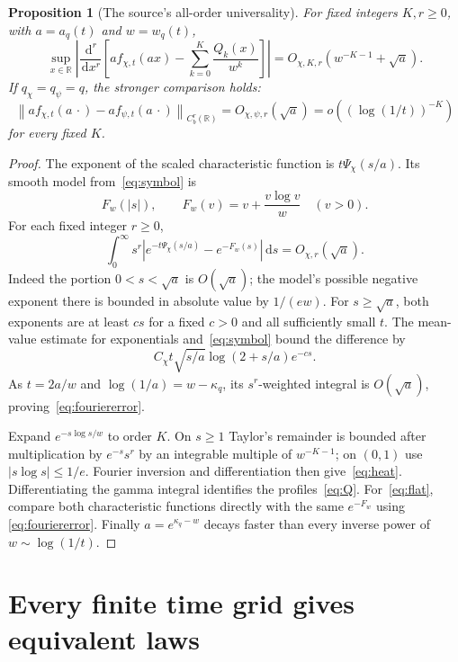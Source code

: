 \documentclass[11pt]{article}
\newtheorem{proposition}[theorem]{Proposition}
\theoremstyle{definition}
\newcommand{\R}{\mathbb R}
\newcommand{\dd}{\,\mathrm d}
\newcommand{\abs}[1]{\left|#1\right|}
\newcommand{\norm}[1]{\left\lVert#1\right\rVert}
\begin{document}
\begin{proposition}[The source's all-order universality]\label{prop:heat}
For fixed integers $K,r\ge0$, with $a=a_q(t)$ and $w=w_q(t)$,
\begin{equation}\label{eq:heat}
 \sup_{x\in\R}\left|\frac{\dd^r}{\dd x^r}
   \left[a f_{\chi,t}(ax)-\sum_{k=0}^K\frac{Q_k(x)}{w^k}\right]\right|
      =O_{\chi,K,r}(w^{-K-1}+\sqrt a).
\end{equation}
If $q_\chi=q_\psi=q$, the stronger comparison holds:
\begin{equation}\label{eq:flat}
 \norm{a f_{\chi,t}(a\,\cdot)-a f_{\psi,t}(a\,\cdot)}_{C_b^r(\R)}
       =O_{\chi,\psi,r}(\sqrt a)
       =o((\log(1/t))^{-K})
\end{equation}
for every fixed $K$.
\end{proposition}

\begin{proof}
The exponent of the scaled characteristic function is $t\Psi_\chi(s/a)$.
Its smooth model from~\eqref{eq:symbol} is
\[
 F_w(\abs s),\qquad F_w(v)=v+\frac{v\log v}{w}\quad(v>0).
\]
For each fixed integer $r\ge0$,
\begin{equation}\label{eq:fouriererror}
 \int_0^\infty s^r
      \abs{e^{-t\Psi_\chi(s/a)}-e^{-F_w(s)}}\dd s
          =O_{\chi,r}(\sqrt a).
\end{equation}
Indeed the portion $0<s<\sqrt a$ is $O(\sqrt a)$; the model's possible negative
exponent there is bounded in absolute value by $1/(ew)$. For $s\ge\sqrt a$,
both exponents are at least $cs$ for a fixed $c>0$ and all sufficiently small
$t$. The mean-value estimate for exponentials and~\eqref{eq:symbol} bound
the difference by
\[
 C_\chi t\sqrt{s/a}\log(2+s/a)e^{-cs}.
\]
As $t=2a/w$ and $\log(1/a)=w-\kappa_q$, its $s^r$-weighted integral is
$O(\sqrt a)$, proving~\eqref{eq:fouriererror}.

Expand $e^{-s\log s/w}$ to order $K$. On $s\ge1$ Taylor's remainder is
bounded after multiplication by $e^{-s}s^r$ by an integrable multiple of
$w^{-K-1}$; on $(0,1)$ use $\abs{s\log s}\le1/e$. Fourier inversion and
differentiation then give~\eqref{eq:heat}. Differentiating the gamma integral
identifies the profiles~\eqref{eq:Q}. For~\eqref{eq:flat}, compare both
characteristic functions directly with the same $e^{-F_w}$ using
\eqref{eq:fouriererror}. Finally $a=e^{\kappa_q-w}$ decays faster than
every inverse power of $w\sim\log(1/t)$.
\end{proof}

\section{Every finite time grid gives equivalent laws}
\label{sec:grid}
\end{document}
